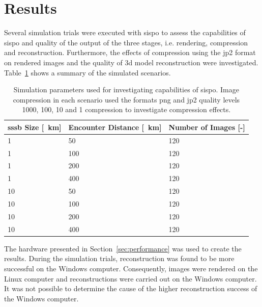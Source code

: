 \section{Results} \label{sec:results}
Several simulation trials were executed with \gls{sispo} to assess the capabilities of \gls{sispo} and quality of the output of the three stages, i.e. rendering, compression and reconstruction. Furthermore, the effects of compression using the \gls{jp2} format on rendered images and the quality of \gls{3d} model reconstruction were investigated. Table~\ref{tab:sim_params} shows a summary of the simulated scenarios.

\begin{table}[htb]
    \centering
    \caption{Simulation parameters used for investigating capabilities of \gls{sispo}. Image compression in each scenario used the formats \gls{png} and \gls{jp2} quality levels 1000, 100, 10 and 1 compression to investigate compression effects.}
    \label{tab:sim_params}
    \begin{tabular}{l|ll}
        \textbf{\gls{sssb} Size [\SI{}{\kilo\meter}]} & \textbf{Encounter Distance [\SI{}{\kilo\meter}]} & \textbf{Number of Images [-]} \\ \hline
        1  & 50  & 120\\
        1  & 100 & 120\\
        1  & 200 & 120\\
        1  & 400 & 120\\
        10 & 50  & 120\\
        10 & 100 & 120\\
        10 & 200 & 120\\
        10 & 400 & 120\\
    \end{tabular}
\end{table}
The hardware presented in Section~\ref{sec:performance} was used to create the results. During the simulation trials, reconstruction was found to be more successful on the Windows computer. Consequently, images were rendered on the Linux computer and reconstructions were carried out on the Windows computer. It was not possible to determine the cause of the higher reconstruction success of the Windows computer.

